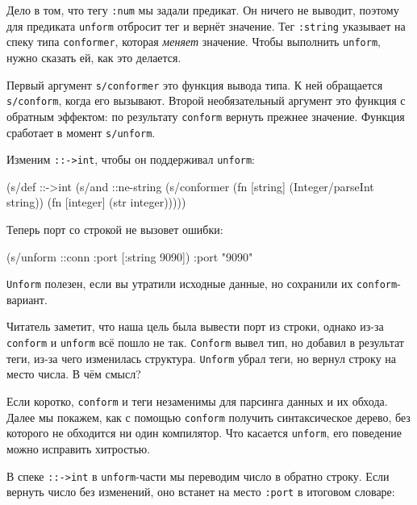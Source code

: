 Дело в том, что тегу \verb|:num| мы задали предикат. Он ничего не выводит,
поэтому для предиката \verb|unform| отбросит тег и вернёт значение. Тег
\verb|:string| указывает на спеку типа \verb|conformer|, которая
\emph{меняет} значение. Чтобы выполнить \verb|unform|, нужно сказать ей, как
это делается.


Первый аргумент \verb|s/conformer| это функция вывода типа. К ней обращается
\verb|s/conform|, когда его вызывают. Второй необязательный аргумент это
функция с обратным эффектом: по результату \verb|conform| вернуть прежнее
значение. Функция сработает в момент \verb|s/unform|.

Изменим \verb|::->int|, чтобы он поддерживал \verb|unform|:

\begin{english}
  \begin{clojure}
(s/def ::->int
  (s/and
   ::ne-string
   (s/conformer
    (fn [string]
      (Integer/parseInt string))
    (fn [integer]
      (str integer)))))
  \end{clojure}
\end{english}

\noindent
Теперь порт со строкой не вызовет ошибки:

\begin{english}
  \begin{clojure}
(s/unform ::conn {:port [:string 9090]})
{:port "9090"}
  \end{clojure}
\end{english}

\verb|Unform| полезен, если вы утратили исходные данные, но сохранили их
\verb|conform|-вариант.

Читатель заметит, что наша цель была вывести порт из строки, однако из-за
\verb|conform| и \verb|unform| всё пошло не так. \verb|Conform| вывел тип,
но добавил в результат теги, из-за чего изменилась структура. \verb|Unform|
убрал теги, но вернул строку на место числа. В чём смысл?

Если коротко, \verb|conform| и теги незаменимы для парсинга данных и их
обхода. Далее мы покажем, как с помощью \verb|conform| получить синтаксическое
дерево, без которого не обходится ни один компилятор. Что касается
\verb|unform|, его поведение можно исправить хитростью.

В спеке \verb|::->int| в \verb|unform|-части мы переводим число в обратно
строку. Если вернуть число без изменений, оно встанет на место \verb|:port| в
итоговом словаре:

